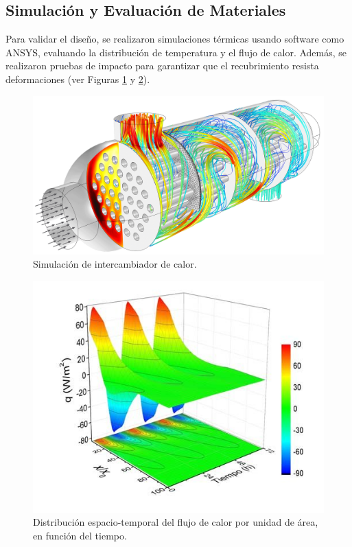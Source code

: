 \documentclass[11pt,a4paper]{article}
\begin{document}
\begin{multicols}{2}
	\subsection{Simulación y Evaluación de Materiales}
	Para validar el diseño, se realizaron simulaciones térmicas usando software como ANSYS, evaluando la distribución de temperatura y el flujo de calor. Además, se realizaron pruebas de impacto para garantizar que el recubrimiento resista deformaciones (ver Figuras  \ref{fig:dist-intcalor} y  \ref{fig:temp-simulation}).
	

 \begin{figure}[H]
 	\centering
 	\includegraphics[width=\linewidth]{figures/dist-intcalor}
 	\caption{Simulación de intercambiador de calor.}
 	\label{fig:dist-intcalor}
 \end{figure}
 
 	\begin{figure}[H]
		\centering
		\includegraphics[width=\linewidth]{figures/temp-simulation}
		\caption{Distribución espacio-temporal del flujo de calor por unidad de área, en función del tiempo.}
		\label{fig:temp-simulation}
	\end{figure}
	

\end{multicols}
\end{document}
